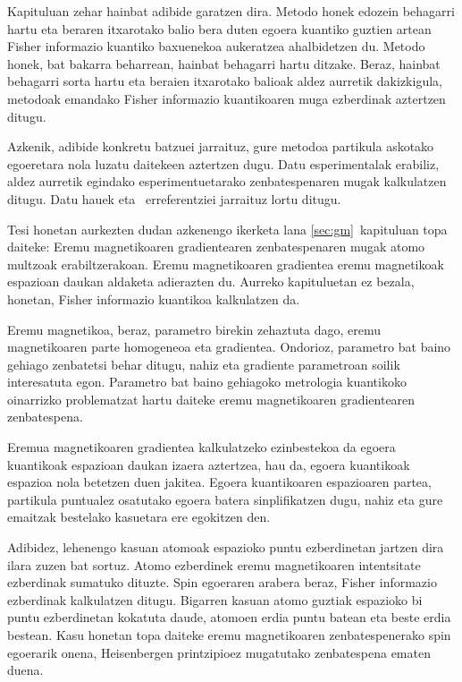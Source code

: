 Kapituluan zehar hainbat adibide garatzen dira.
Metodo honek edozein behagarri hartu eta beraren itxarotako balio bera duten egoera kuantiko guztien artean Fisher informazio kuantiko baxuenekoa aukeratzea ahalbidetzen du.
Metodo honek, bat bakarra beharrean, hainbat behagarri hartu ditzake.
Beraz, hainbat behagarri sorta hartu eta beraien itxarotako balioak aldez aurretik dakizkigula, metodoak emandako Fisher informazio kuantikoaren muga ezberdinak aztertzen ditugu.

Azkenik, adibide konkretu batzuei jarraituz, gure metodoa partikula askotako egoeretara nola luzatu daitekeen aztertzen dugu.
Datu esperimentalak erabiliz, aldez aurretik egindako esperimentuetarako zenbatespenaren mugak kalkulatzen ditugu.
Datu hauek \cite{Luecke2014} eta \cite{Gross2010}~erreferentziei jarraituz lortu ditugu.

Tesi honetan aurkezten dudan azkenengo ikerketa lana \ref{sec:gm}~kapituluan topa daiteke: Eremu magnetikoaren gradientearen zenbatespenaren mugak atomo multzoak erabiltzerakoan.
Eremu magnetikoaren gradientea eremu magnetikoak espazioan daukan aldaketa adierazten du.
Aurreko kapituluetan ez bezala, honetan, Fisher informazio kuantikoa kalkulatzen da.

Eremu magnetikoa, beraz, parametro birekin zehaztuta dago, eremu magnetikoaren parte homogeneoa eta gradientea.
Ondorioz, parametro bat baino gehiago zenbatetsi behar ditugu, nahiz eta gradiente parametroan soilik interesatuta egon.
Parametro bat baino gehiagoko metrologia kuantikoko oinarrizko problematzat hartu daiteke eremu magnetikoaren gradientearen zenbatespena.

Eremua magnetikoaren gradientea kalkulatzeko ezinbestekoa da egoera kuantikoak espazioan daukan izaera aztertzea, hau da, egoera kuantikoak espazioa nola betetzen duen jakitea.
Egoera kuantikoaren espazioaren partea, partikula puntualez osatutako egoera batera sinplifikatzen dugu, nahiz eta gure emaitzak bestelako kasuetara ere egokitzen den.

Adibidez, lehenengo kasuan atomoak espazioko puntu ezberdinetan jartzen dira ilara zuzen bat sortuz.
Atomo ezberdinek eremu magnetikoaren intentsitate ezberdinak sumatuko dituzte.
Spin egoeraren arabera beraz, Fisher informazio ezberdinak kalkulatzen ditugu.
Bigarren kasuan atomo guztiak espazioko bi puntu ezberdinetan kokatuta daude, atomoen erdia puntu batean eta beste erdia bestean.
Kasu honetan topa daiteke eremu magnetikoaren zenbatespenerako spin egoerarik onena, Heisenbergen printzipioez mugatutako zenbatespena ematen duena.

